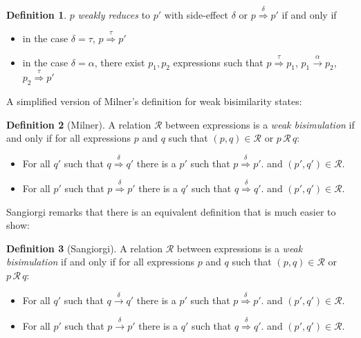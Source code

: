 \documentclass[12pt,twoside,notitlepage]{report}
\theoremstyle{plain}%
\theoremstyle{definition}
\newtheorem{defn}{Definition}[section]
\theoremstyle{remark}
\begin{document}
\begin{defn}
$ p $ \textit{weakly reduces} to $ p' $ with side-effect $ \delta $ or $ p \overset{\delta}{\Rightarrow} p' $ if and only if 
\begin{itemize}
\item{in the case $ \delta = \tau $, $ p \overset{\tau}{\Rightarrow} p' $}
\item{in the case $ \delta = \alpha $, there exist $ p_1, p_2 $ expressions such that $ p \overset{\tau}{\Rightarrow} p_1 $, $ p_1 \overset{\alpha}{\rightarrow} p_2 $, $ p_2 \overset{\tau}{\Rightarrow} p' $}
\end{itemize}
\end{defn}

A simplified version of Milner's definition for weak bisimilarity states:
\begin{defn}[Milner]
A relation $ \mathcal{R} $ between expressions is a \textit{weak bisimulation} if and only if for all expressions $ p $ and $ q $ such that $ (p,q)\in \mathcal{R} $ or $ p\, \mathcal{R}\, q $:
\begin{itemize}
\item{For all $ q' $ such that $ q \overset{\delta}{\Rightarrow} q' $ there is a $ p' $ such that $ p \overset{\delta}{\Rightarrow} p' $. and $ (p', q') \in \mathcal{R}$. }
\item{For all $ p' $ such that $ p \overset{\delta}{\Rightarrow} p' $ there is a $ q' $ such that $ q \overset{\delta}{\Rightarrow} q' $. and $ (p', q') \in \mathcal{R}$. }
\end{itemize}
\end{defn}

Sangiorgi\cite{sangiorgi1992problem} remarks that there is an equivalent definition that is much easier to show:
\begin{defn}[Sangiorgi]
A relation $ \mathcal{R} $ between expressions is a \textit{weak bisimulation} if and only if for all expressions $ p $ and $ q $ such that $ (p,q)\in \mathcal{R} $ or $ p\, \mathcal{R}\, q $:
\begin{itemize}
\item{For all $ q' $ such that $ q \overset{\delta}{\rightarrow} q' $ there is a $ p' $ such that $ p \overset{\delta}{\Rightarrow} p' $. and $ (p', q') \in \mathcal{R}$. }
\item{For all $ p' $ such that $ p \overset{\delta}{\rightarrow} p' $ there is a $ q' $ such that $ q \overset{\delta}{\Rightarrow} q' $. and $ (p', q') \in \mathcal{R}$. }
\end{itemize}
\end{defn}
\end{document}
